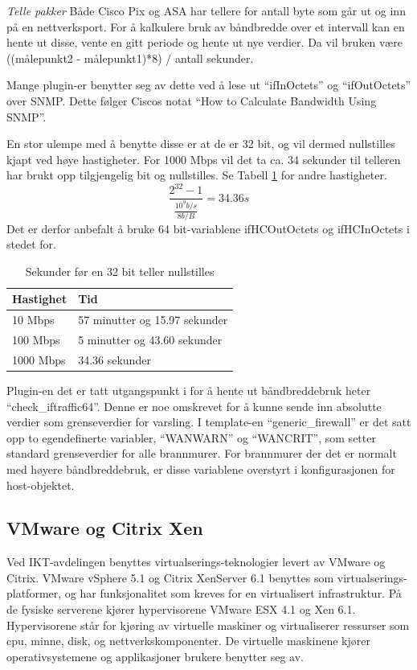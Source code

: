 \textit{Telle pakker}
Både Cisco Pix og ASA har tellere for antall byte som går ut og inn på en nettverksport. For å kalkulere bruk av båndbredde over et intervall kan en hente ut disse, vente en gitt periode og hente ut nye verdier. Da vil bruken være ((målepunkt2 - målepunkt1)*8) / antall sekunder.

Mange plugin-er benytter seg av dette ved å lese ut ``ifInOctets'' og ``ifOutOctets'' over SNMP. Dette følger Ciscos notat ``How to Calculate Bandwidth Using SNMP''\cite{ciscobandwidth}. 

En stor ulempe med å benytte disse er at de er 32 bit, og vil dermed nullstilles kjapt ved høye hastigheter. For 1000 Mbps vil det ta ca. 34 sekunder til telleren har brukt opp tilgjengelig bit og nullstilles. Se Tabell \ref{kalkulering_teller} for andre hastigheter.
\begin{equation}
\frac{2^{32}-1}{\frac{10^9b/s}{8b/B}}=34.36s
\end{equation}
Det er derfor anbefalt å bruke 64 bit-variablene ifHCOutOctets og ifHCInOctets i stedet for\cite{ciscosnmpcounters}.
\begin{table}
\begin{center}
\begin{tabular}{ | l | p{7cm} |} \hline
    \textbf{Hastighet} & \textbf{Tid} \\ \hline
    10 Mbps & 57 minutter og 15.97 sekunder \\ \hline
    100 Mbps & 5 minutter og 43.60 sekunder \\ \hline
    1000 Mbps & 34.36 sekunder \\ \hline
\end{tabular}
\caption{Sekunder før en 32 bit teller nullstilles }
\label{kalkulering_teller}
\end{center}
\end{table}
Plugin-en det er tatt utgangspunkt i for å hente ut båndbreddebruk heter ``check\_iftraffic64\cite{checkciscoif}''. Denne er noe omskrevet for å kunne sende inn absolutte verdier som grenseverdier for varsling. I template-en ``generic\_firewall'' er det satt opp to egendefinerte variabler, ``WANWARN'' og ``WANCRIT'', som setter standard grenseverdier for alle brannmurer. For brannmurer der det er normalt med høyere båndbreddebruk, er disse variablene overstyrt i konfigurasjonen for host-objektet.

\subsection{VMware og Citrix Xen}
Ved IKT-avdelingen benyttes virtualserings-teknologier levert av VMware og Citrix. VMware vSphere 5.1 og Citrix XenServer 6.1 benyttes som virtualserings-platformer, og har funksjonalitet som kreves for en virtualisert infrastruktur. På de fysiske serverene kjører hypervisorene VMware ESX 4.1 og Xen 6.1. Hypervisorene står for kjøring av virtuelle maskiner og virtualiserer ressurser som cpu, minne, disk, og nettverkskomponenter. De virtuelle maskinene kjører operativsystemene og applikasjoner brukere benytter seg av.  

